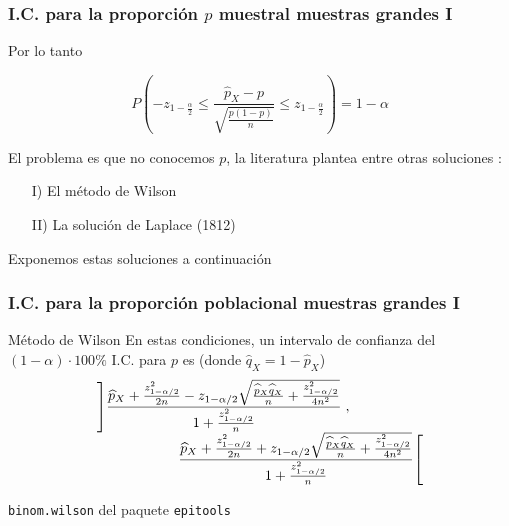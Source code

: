 \documentclass[12pt,t]{beamer}\usepackage[]{graphicx}\usepackage[]{color}
\renewcommand{\leq}{\leqslant}
\theoremstyle{plain}
\theoremstyle{definition}
\begin{document}
\begin{frame}
\frametitle{I.C. para la proporción $p$ muestral muestras grandes I}
Por lo tanto

$$
P\left(-z_{1-\frac{\alpha}{2}}\leq \dfrac{\widehat{p}_{X}-p}
{\sqrt{\frac{p(1-p)}{n}}}\leq z_{1-\frac{\alpha}{2}}\right)=1-\alpha
$$

El problema es que no conocemos $p$, la literatura plantea entre otras soluciones :

\begin{itemize}
\item[I)] El método de Wilson
\item[II)] La solución de Laplace (1812)
\end{itemize}

Exponemos estas soluciones a continuación
\end{frame}


\begin{frame}
\frametitle{I.C. para la proporción poblacional muestras grandes I}

\begin{block}{Método de Wilson}
En estas  condiciones, un intervalo  de confianza  del $(1-\alpha)\cdot 100\%$ I.C. para $p$ es  (donde $\widehat{q}_{X}=1-\widehat{p}_{X}$)
$$
\begin{array}{l}
\displaystyle \left]\frac{\widehat{p}_{X}+\frac{z_{1-{\alpha}/{2}}^2}{2n}-z_{1-{\alpha}/{2}}\sqrt{\frac{\widehat{p}_{X}\widehat{q}_{X}}{n}+\frac{z_{1-{\alpha}/{2}}^2}{4n^2}}}{1+\frac{z_{1-{\alpha}/{2}}^2}{n}}\right.,\\[2ex]
\hspace*{2cm} \displaystyle \left.\frac{\widehat{p}_{X}+\frac{z_{1-{\alpha}/{2}}^2}{2n}+z_{1-{\alpha}/{2}}\sqrt{\frac{\widehat{p}_{X}\widehat{q}_{X}}{n}+\frac{z_{1-{\alpha}/{2}}^2}{4n^2}}}{1+\frac{z_{1-{\alpha}/{2}}^2}{n}}\right[
\end{array}
$$
\end{block}
\medskip

\texttt{binom.wilson} del paquete \texttt{epitools}
\end{frame}
\end{document}
